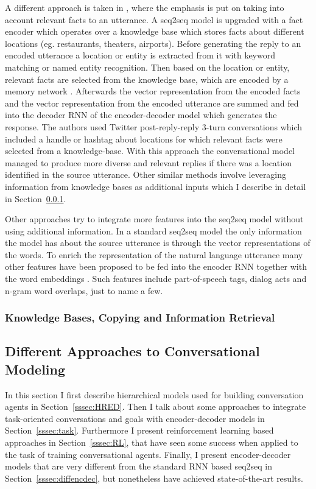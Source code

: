 \documentclass[12pt]{article}
\begin{document}
A different approach is taken in \cite{Ghazvininejad:2017}, where the emphasis is put on taking into account relevant facts to an utterance. A seq2seq model is upgraded with a fact encoder which operates over a knowledge base which stores facts about different locations (eg. restaurants, theaters, airports). Before generating the reply to an encoded utterance a location or entity is extracted from it with keyword matching or named entity recognition. Then based on the location or entity, relevant facts are selected from the knowledge base, which are encoded by a memory network \cite{Sukhbaatar:2015}. Afterwards the vector representation from the encoded facts and the vector representation from the encoded utterance are summed and fed into the decoder RNN of the encoder-decoder model which generates the response. The authors used Twitter post-reply-reply 3-turn conversations which included a handle or hashtag about locations for which relevant facts were selected from a knowledge-base. With this approach the conversational model managed to produce more diverse and relevant replies if there was a location identified in the source utterance. Other similar methods involve leveraging information from knowledge bases as additional inputs which I describe in detail in Section~\ref{sssec:KB}. 

Other approaches try to integrate more features into the seq2seq model without using additional information. In a standard seq2seq model the only information the model has about the source utterance is through the vector representations of the words. To enrich the representation of the natural language utterance many other features have been proposed to be fed into the encoder RNN together with the word embeddings \cite{Sordoni:2015, Serban_MrRNN:2017,Serban:2017}. Such features include part-of-speech tags, dialog acts and n-gram word overlaps, just to name a few.

\subsubsection{Knowledge Bases, Copying and Information Retrieval} \label{sssec:KB}
\subsection{Different Approaches to Conversational Modeling} \label{ssec:33}
In this section I first describe hierarchical models used for building conversation agents in Section~\ref{sssec:HRED}. Then I talk about some approaches to integrate task-oriented conversations and goals with encoder-decoder models in Section~\ref{sssec:task}. Furthermore I present reinforcement learning based approaches in Section~\ref{sssec:RL}, that have seen some success when applied to the task of training conversational agents. Finally, I present encoder-decoder models that are very different from the standard RNN based seq2seq in Section~\ref{sssec:diffencdec}, but nonetheless have achieved state-of-the-art results.
\end{document}
